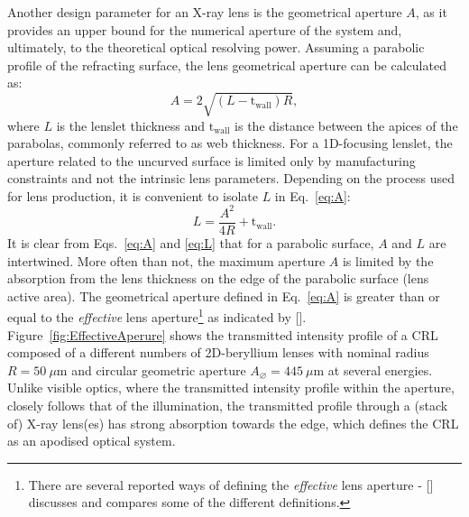 \begin{refsection}
Another design parameter for an X-ray lens is the geometrical aperture $A$, as it provides an upper bound for the numerical aperture of the system and, ultimately, to the theoretical optical resolving power. Assuming a parabolic profile of the refracting surface, the lens geometrical aperture can be calculated as:
\begin{equation}\label{eq:A}
    A = 2\sqrt{(L-\text{t}_\text{wall})R},
\end{equation}{}
where $L$ is the lenslet thickness and $\text{t}_\text{wall}$ is the distance between the apices of the parabolas, commonly referred to as web thickness. For a 1D-focusing lenslet, the aperture related to the uncurved surface is limited only by manufacturing constraints and not the intrinsic lens parameters. Depending on the process used for lens production, it is convenient to isolate $L$ in Eq.~\ref{eq:A}:
\begin{equation}\label{eq:L}
    L = \frac{A^2}{4R}+\text{t}_\text{wall}.
\end{equation}{}
It is clear from Eqs.~\ref{eq:A} and \ref{eq:L} that for a parabolic surface, $A$ and $L$ are intertwined. More often than not, the maximum aperture $A$ is limited by the absorption from the lens thickness on the edge of the parabolic surface (lens active area). The geometrical aperture defined in Eq.~\ref{eq:A} is greater than or equal to the \textit{effective} lens aperture\footnote{There are several reported ways of defining the \textit{effective} lens aperture - [\cite{Kohn2017}] discusses and compares some of the different definitions. } as indicated by [\cite{Kohn2017}]. Figure~\ref{fig:EffectiveAperure} shows the transmitted intensity profile of a CRL composed of a different numbers of 2D-beryllium lenses with nominal radius $R=50~\mu\mathrm{m}$ and circular geometric aperture $A_{\diameter}=445~ \mu\mathrm{m}$ at several energies. Unlike visible optics, where the transmitted intensity profile within the aperture, closely follows that of the illumination, the transmitted profile through a (stack of) X-ray lens(es) has strong absorption towards the edge, which defines the CRL as an apodised optical system.


\end{refsection}
